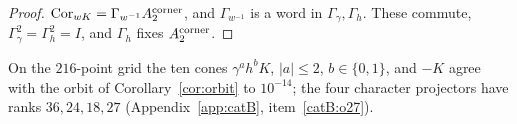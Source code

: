 \begin{proof}
$\mathrm{Cor}_{wK}=\Gamma_{w^{-1}}A_2^{\rm corner}$, and $\Gamma_{w^{-1}}$ is a word in $\Gamma_\gamma,\Gamma_h$. These commute, $\Gamma_\gamma^2=\Gamma_h^2=I$, and $\Gamma_h$ fixes $A_2^{\rm corner}$.
\end{proof}
\begin{catbremark}
On the $216$-point grid the ten cones $\gamma^ah^bK$, $|a|\le2$, $b\in\{0,1\}$, and $-K$ agree with the orbit of Corollary~\ref{cor:orbit} to $10^{-14}$; the four character projectors
have ranks $36,24,18,27$ (Appendix~\ref{app:catB}, item~\ref{catB:o27}).
\end{catbremark}
